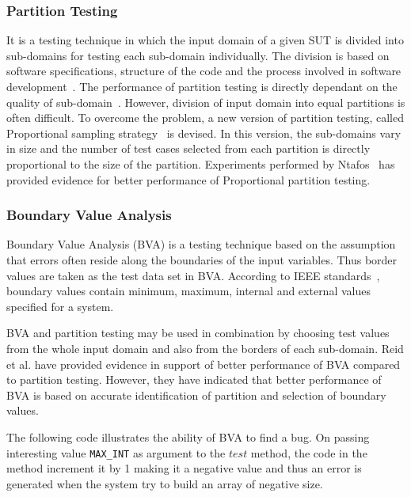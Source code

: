 \subsubsection{Partition Testing}
It is a testing technique in which the input domain of a given SUT is divided into sub-domains for testing each sub-domain individually. The division is based on software specifications, structure of the code and the process involved in software development~\cite{hamlet1990}. The performance of partition testing is directly dependant on the quality of sub-domain~\cite{weyuker1991analyzing}. However, division of input domain into equal partitions is often difficult. To overcome the problem, a new version of partition testing, called Proportional sampling strategy~\cite{Chan1996} is devised. In this version, the sub-domains vary in size and the number of test cases selected from each partition is directly proportional to the size of the partition. Experiments performed by Ntafos~\cite{ntafos1998random} has provided evidence for better performance of Proportional partition testing.


\subsubsection{Boundary Value Analysis}
Boundary Value Analysis (BVA) is a testing technique based on the assumption that errors often reside along the boundaries of the input variables. Thus border values are taken as the test data set in BVA. According to IEEE standards~\cite{radatz1990ieee}, boundary values contain minimum, maximum, internal and external values specified for a system. 

BVA  and partition testing may be used in combination by choosing test values from the whole input domain and also from the borders of each sub-domain. Reid et al. \cite{reid1997empirical} have provided evidence in support of better performance of BVA compared to partition testing. However, they have indicated that better performance of BVA is based on accurate identification of partition and selection of boundary values.

 The following code illustrates the ability of BVA to find a bug.  On passing interesting value \verb+MAX_INT+ as argument to the $test$ method, the code in the method increment it by 1 making it a negative value and thus an error is generated when the system try to build an array of negative size.

